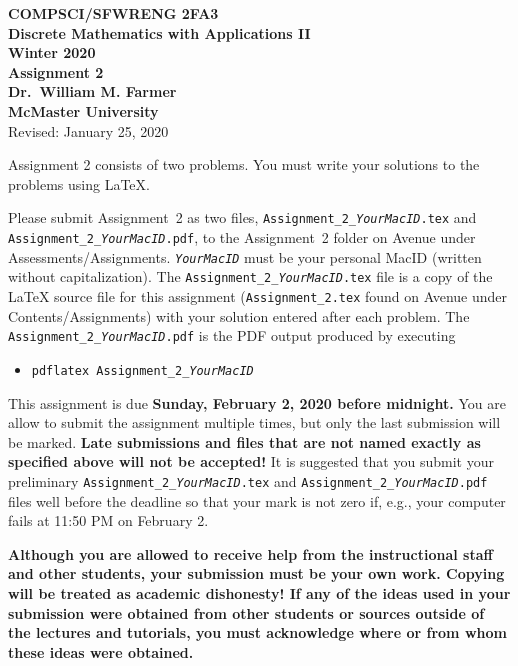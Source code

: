 \documentclass[11pt,fleqn]{article}
\begin{document}
\begin{center}

  {\large \textbf{COMPSCI/SFWRENG 2FA3}}\\[2mm]
  {\large \textbf{Discrete Mathematics with Applications II}}\\[2mm]
  {\large \textbf{Winter 2020}}\\[8mm]
  {\huge \textbf{Assignment 2}}\\[6mm]
  {\large \textbf{Dr.~William M. Farmer}}\\[2mm]
  {\large \textbf{McMaster University}}\\[6mm]
  {\large Revised: January 25, 2020}

\end{center}

\medskip

Assignment 2 consists of two problems.  You must write your solutions
to the problems using LaTeX.

Please submit Assignment~2 as two files,
\texttt{Assignment\_2\_\emph{YourMacID}.tex} and
\texttt{Assignment\_2\_\emph{YourMacID}.pdf}, to the Assignment~2
folder on Avenue under Assessments/Assignments.
\texttt{\emph{YourMacID}} must be your personal MacID (written without
capitalization).  The \texttt{Assignment\_2\_\emph{YourMacID}.tex}
file is a copy of the LaTeX source file for this assignment
(\texttt{Assignment\_2.tex} found on Avenue under
Contents/Assignments) with your solution entered after each problem.
The \texttt{Assignment\_2\_\emph{YourMacID}.pdf} is the PDF output
produced by executing

\begin{itemize}

  \item[] \texttt{pdflatex Assignment\_2\_\emph{YourMacID}}

\end{itemize}

This assignment is due \textbf{Sunday, February 2, 2020 before
  midnight.}  You are allow to submit the assignment multiple times,
but only the last submission will be marked.  \textbf{Late submissions
  and files that are not named exactly as specified above will not be
  accepted!}  It is suggested that you submit your preliminary
\texttt{Assignment\_2\_\emph{YourMacID}.tex} and
\texttt{Assignment\_2\_\emph{YourMacID}.pdf} files well before the
deadline so that your mark is not zero if, e.g., your computer fails
at 11:50 PM on February 2.

\textbf{Although you are allowed to receive help from the
  instructional staff and other students, your submission must be your
  own work.  Copying will be treated as academic dishonesty! If any of
  the ideas used in your submission were obtained from other students
  or sources outside of the lectures and tutorials, you must
  acknowledge where or from whom these ideas were obtained.}
\end{document}
